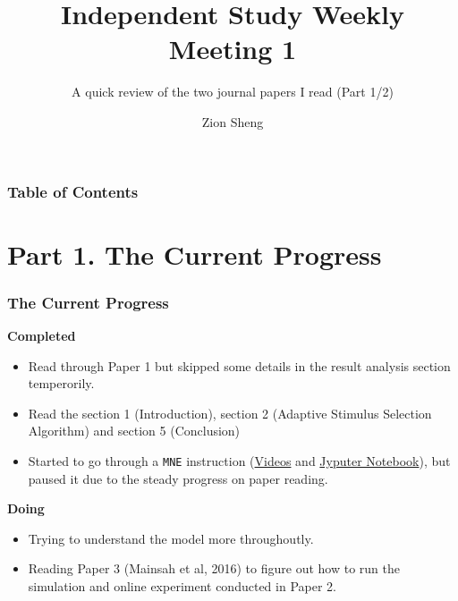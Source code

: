 \documentclass{beamer}
\title[Independent Study Weekly Meeting 1] %
{Independent Study Weekly Meeting 1}
\subtitle{A quick review of the two journal papers I read (Part 1/2)}
\author[Zion Sheng] %
{Zion Sheng}
\institute[Duke ECE] %
{
	Department of ECE\\
	Duke University
}
\begin{document}
	\justifying
	\frame{\titlepage} 

	\begin{frame}
		\frametitle{Table of Contents}
		\tableofcontents
	\end{frame}

	\section{Part 1. The Current Progress}
	\begin{frame}[t]
		\frametitle{The Current Progress}
		\textbf{Completed}
		\begin{itemize}
			\justifying
			\item Read through Paper 1 but skipped some details in the result analysis section temperorily.
			\item Read the section 1 (Introduction), section 2 (Adaptive Stimulus Selection Algorithm) and section 5 (Conclusion)
			\item Started to go through a \texttt{MNE} instruction (\href{https://www.youtube.com/watch?v=t-twhNqgfSY&t=439s}{Videos} and \href{https://github.com/zs144/learn-pybrain-mne}{Jyputer Notebook}), but paused it due to the steady progress on paper reading.
		\end{itemize}

		\textbf{Doing}
			\begin{itemize}
				\justifying
				\item Trying to understand the model more throughoutly.
				\item Reading Paper 3 (Mainsah et al, 2016) to figure out how to run the simulation and online experiment conducted in Paper 2.
			\end{itemize}

	\end{frame}
	
\end{document}
